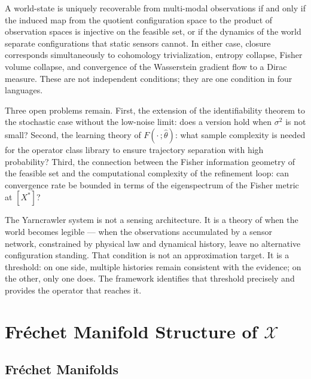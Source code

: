 \documentclass[11pt, oneside]{article}
\begin{document}
A world-state is uniquely recoverable from multi-modal observations if and only if the
induced map from the quotient configuration space to the product of observation spaces is
injective on the feasible set, or if the dynamics of the world separate configurations
that static sensors cannot. In either case, closure corresponds simultaneously to
cohomology trivialization, entropy collapse, Fisher volume collapse, and convergence of the
Wasserstein gradient flow to a Dirac measure. These are not independent conditions; they
are one condition in four languages.

Three open problems remain. First, the extension of the identifiability theorem to the
stochastic case without the low-noise limit: does a version hold when $\sigma^2$ is not
small? Second, the learning theory of $F(\cdot\,;\hat{\theta})$: what sample complexity
is needed for the operator class library to ensure trajectory separation with high
probability? Third, the connection between the Fisher information geometry of the feasible
set and the computational complexity of the refinement loop: can convergence rate be
bounded in terms of the eigenspectrum of the Fisher metric at $[X^*]$?

The Yarncrawler system is not a sensing architecture. It is a theory of when the world
becomes legible --- when the observations accumulated by a sensor network, constrained by
physical law and dynamical history, leave no alternative configuration standing. That
condition is not an approximation target. It is a threshold: on one side, multiple
histories remain consistent with the evidence; on the other, only one does. The framework
identifies that threshold precisely and provides the operator that reaches it.


\appendix

\section{Fréchet Manifold Structure of $\mathcal{X}$}
\label{app:frechet}

\subsection{Fréchet Manifolds}
\end{document}
